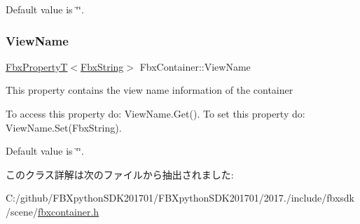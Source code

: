 Default value is \char`\"{}\char`\"{}. \mbox{\label{class_fbx_container_afdbbb7add5452cf3ee2fcf13c47a00cf}} 
\subsubsection{\texorpdfstring{View\+Name}{ViewName}}
{\footnotesize\ttfamily \hyperlink{class_fbx_property_t}{Fbx\+PropertyT}$<$\hyperlink{class_fbx_string}{Fbx\+String}$>$ Fbx\+Container\+::\+View\+Name}

This property contains the view name information of the container

To access this property do\+: View\+Name.\+Get(). To set this property do\+: View\+Name.\+Set(\+Fbx\+String).

Default value is \char`\"{}\char`\"{}. 

このクラス詳解は次のファイルから抽出されました\+:\begin{DoxyCompactItemize}
\item 
C\+:/github/\+F\+B\+Xpython\+S\+D\+K201701/\+F\+B\+Xpython\+S\+D\+K201701/2017./include/fbxsdk/scene/\hyperlink{fbxcontainer_8h}{fbxcontainer.\+h}\end{DoxyCompactItemize}
